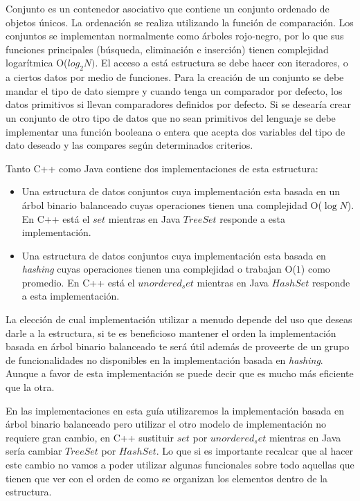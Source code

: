 Conjunto es un contenedor asociativo que contiene un conjunto ordenado de objetos únicos. La ordenación se realiza utilizando la función de comparación. Los conjuntos se implementan normalmente
como árboles rojo-negro, por lo que sus funciones principales (búsqueda, eliminación e inserción)
tienen complejidad logarítmica O($log_2 N)$. El acceso a está estructura se debe hacer con iteradores, o a ciertos datos por medio de funciones. Para la creación de un conjunto se debe mandar el tipo de dato siempre y cuando tenga un comparador por defecto, los datos primitivos si llevan comparadores definidos por defecto. Si se desearía crear un conjunto de otro tipo de datos que no sean primitivos del lenguaje se debe implementar una función booleana o entera que acepta dos variables del tipo de dato deseado y las compares según determinados criterios.

Tanto C++ como Java contiene dos implementaciones de esta estructura: 

\begin{itemize}
	\item Una estructura de datos conjuntos cuya implementación esta basada en un árbol binario balanceado cuyas operaciones tienen una complejidad O($\log N$). En C++ está el $set$ mientras en Java $TreeSet$ responde a esta implementación.
	\item Una estructura de datos conjuntos cuya implementación esta basada en \emph{hashing} cuyas operaciones tienen una complejidad o trabajan O($1$) como promedio. En C++ está el $unordered_set$ mientras en Java $HashSet$ responde a esta implementación.
\end{itemize}

La elección de cual implementación utilizar a menudo depende del uso que deseas darle a la estructura, si te es beneficioso mantener el orden la implementación basada en árbol binario balanceado te será útil además de proveerte de un grupo de funcionalidades no disponibles en la implementación basada en \emph{hashing}. Aunque a favor de esta implementación se puede decir que es mucho más eficiente que la otra. 

En las implementaciones en esta guía utilizaremos la implementación basada en árbol binario balanceado pero utilizar el otro modelo de implementación no requiere gran cambio, en C++ sustituir $set$ por $unordered_set$ mientras en Java sería cambiar $TreeSet$ por $HashSet$. Lo que si es importante recalcar que al hacer este cambio no vamos a poder utilizar algunas funcionales sobre todo aquellas que tienen que ver con el orden de como se organizan los elementos dentro de la estructura. 

